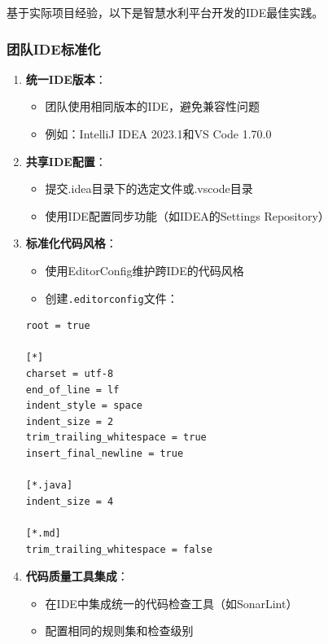 基于实际项目经验，以下是智慧水利平台开发的IDE最佳实践。

\subsubsection{团队IDE标准化}\label{ux56e2ux961fideux6807ux51c6ux5316}

\begin{enumerate}
\def\labelenumi{\arabic{enumi}.}
\tightlist
\item
  \textbf{统一IDE版本}：

  \begin{itemize}
  \tightlist
  \item
    团队使用相同版本的IDE，避免兼容性问题
  \item
    例如：IntelliJ IDEA 2023.1和VS Code 1.70.0
  \end{itemize}
\item
  \textbf{共享IDE配置}：

  \begin{itemize}
  \tightlist
  \item
    提交.idea目录下的选定文件或.vscode目录
  \item
    使用IDE配置同步功能（如IDEA的Settings Repository）
  \end{itemize}
\item
  \textbf{标准化代码风格}：

  \begin{itemize}
  \tightlist
  \item
    使用EditorConfig维护跨IDE的代码风格
  \item
    创建\passthrough{\lstinline!.editorconfig!}文件：
  \end{itemize}

\begin{lstlisting}
root = true

[*]
charset = utf-8
end_of_line = lf
indent_style = space
indent_size = 2
trim_trailing_whitespace = true
insert_final_newline = true

[*.java]
indent_size = 4

[*.md]
trim_trailing_whitespace = false
\end{lstlisting}
\item
  \textbf{代码质量工具集成}：

  \begin{itemize}
  \tightlist
  \item
    在IDE中集成统一的代码检查工具（如SonarLint）
  \item
    配置相同的规则集和检查级别
  \end{itemize}
\end{enumerate}

